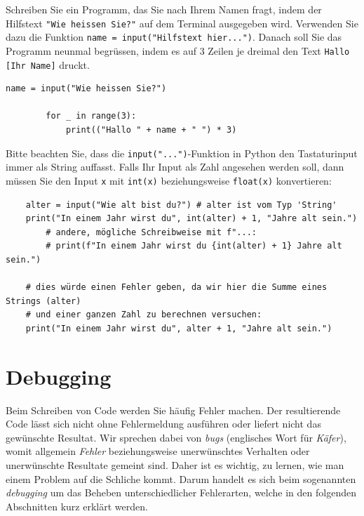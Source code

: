 \begin{myexercise}\label{ex:name}
	Schreiben Sie ein Programm, das Sie nach Ihrem Namen fragt, indem der Hilfstext \lstinline|"Wie heissen Sie?"| auf dem Terminal ausgegeben wird. Verwenden Sie dazu die Funktion \lstinline|name = input("Hilfstext hier...")|. Danach soll Sie das Programm neunmal begrüssen, indem es auf 3 Zeilen je dreimal den Text \texttt{Hallo [Ihr Name]} druckt.
	\begin{myanswer}
		\begin{lstlisting}[numbers=none]
		name = input("Wie heissen Sie?")
		
		for _ in range(3):
			print(("Hallo " + name + " ") * 3)
	  \end{lstlisting}
	\end{myanswer}
\end{myexercise}


\begin{myremark}\label{myremark:input_takes_string}
	Bitte beachten Sie, dass die \lstinline{input("...")}-Funktion in Python den Tastaturinput immer als String auffasst. Falls Ihr Input als Zahl angesehen werden soll, dann müssen Sie den Input \lstinline|x| mit \lstinline|int(x)| beziehungsweise \lstinline|float(x)| konvertieren:
	\begin{lstlisting}
	alter = input("Wie alt bist du?") # alter ist vom Typ 'String'
	print("In einem Jahr wirst du", int(alter) + 1, "Jahre alt sein.")
		# andere, mögliche Schreibweise mit f"...:
		# print(f"In einem Jahr wirst du {int(alter) + 1} Jahre alt sein.")
	
	# dies würde einen Fehler geben, da wir hier die Summe eines Strings (alter)
	# und einer ganzen Zahl zu berechnen versuchen:
	print("In einem Jahr wirst du", alter + 1, "Jahre alt sein.")
	\end{lstlisting}
\end{myremark}


\section{Debugging}
Beim Schreiben von Code werden Sie häufig Fehler machen. Der resultierende Code lässt sich nicht ohne Fehlermeldung ausführen oder liefert nicht das gewünschte Resultat. Wir sprechen dabei von \emph{bugs} (englisches Wort für \emph{Käfer}), womit allgemein \emph{Fehler} beziehungsweise unerwünschtes Verhalten oder unerwünschte Resultate gemeint sind. Daher ist es wichtig, zu lernen, wie man einem Problem auf die Schliche kommt. Darum handelt es sich beim sogenannten \emph{debugging} um das Beheben unterschiedlicher Fehlerarten, welche in den folgenden Abschnitten kurz erklärt werden.

